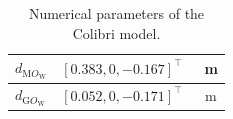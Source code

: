 \begin{table}[ht]
\begin{tabular}{|l|c|c|}
       $d_{\text{M}O_{\text{W}}}$  & $[0.383,0,-0.167]^\top$ & \SI{}{\meter}\\
      \hline
       $d_{\text{G}O_{\text{W}}}$  & $[0.052,0,-0.171]^\top$ & \SI{}{\meter}\\
      \hline
    \end{tabular}
    \caption{ Numerical parameters of the Colibri model.}
    \label{tab:pars_colibri}
\end{table}

